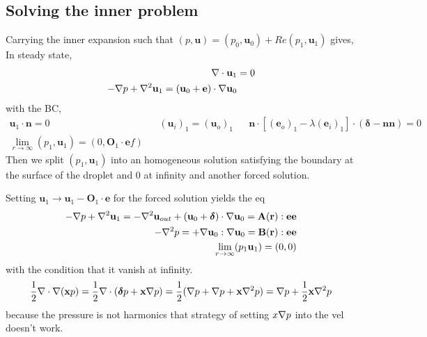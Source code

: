 \subsection{Solving the inner problem}

Carrying the inner expansion such that $(p,\textbf{u}) = (p_0,\textbf{u}_0)+ Re (p_1,\textbf{u}_1)$ gives,
In steady state,
\begin{align}
    \mathbf{\nabla}\cdot \textbf{u}_1 &= 0
    \\
    -\mathbf{\nabla} p + \mathbf{\nabla}^2 \textbf{u}_1
    = 
    (\textbf{u}_0+ \textbf{e})\cdot \mathbf{\nabla} \textbf{u}_0
\end{align}
with the BC, 
\begin{align}
    \textbf{u}_1 \cdot \textbf{n} = 0 
    &&
    (\textbf{u}_i)_1  =(\textbf{u}_o)_1
    &&
    \textbf{n}\cdot [(\textbf{e}_o)_1 - \lambda(\textbf{e}_i)_1]\cdot (\bm\delta - \textbf{nn})
    =0 \\
    \lim_{r\to \infty }(p_1,\textbf{u}_1)= (0,\textbf{O}_1 \cdot \textbf{e}f)
\end{align}
Then we split $(p_1,\textbf{u}_1)$ into an homogeneous solution satisfying the boundary at the surface of the droplet and $0$ at infinity and another forced solution. 

Setting $\textbf{u}_1 \to \textbf{u}_1 - \textbf{O}_1\cdot \textbf{e}$ for the forced solution yields the eq 
\begin{align}
    -\mathbf{\nabla} p 
    + \mathbf{\nabla}^2 \textbf{u}_1
    = 
    - \mathbf{\nabla}^2 \textbf{u}_{out}
    + (\textbf{u}_0 + \bm\delta) \cdot \mathbf{\nabla} \textbf{u}_0= \textbf{A}(\textbf{r}): \textbf{ee}\\
    -\mathbf{\nabla}^2  p 
    = 
    + \mathbf{\nabla}\textbf{u}_0 : \mathbf{\nabla} \textbf{u}_0
    = \textbf{B}(\textbf{r}): \textbf{ee}
    \\
    \lim_{r\to\infty} (p_1 \textbf{u}_1) = (0,0)
\end{align}
with the condition that it vanish at infinity. 
\begin{equation}
    \frac{1}{2}\mathbf{\nabla}\cdot\mathbf{\nabla} (\textbf{x} p )= \frac{1}{2}\mathbf{\nabla}\cdot(\bm\delta  p + \textbf{x}\mathbf{\nabla} p)
    =\frac{1}{2}(\mathbf{\nabla}  p + \mathbf{\nabla} p + \textbf{x}\mathbf{\nabla}^2 p)
    =\mathbf{\nabla}  p +\frac{1}{2}\textbf{x}\mathbf{\nabla}^2 p
\end{equation}
because the pressure is not harmonics that strategy of setting $x\mathbf{\nabla} p$ into the vel doesn't work. 

